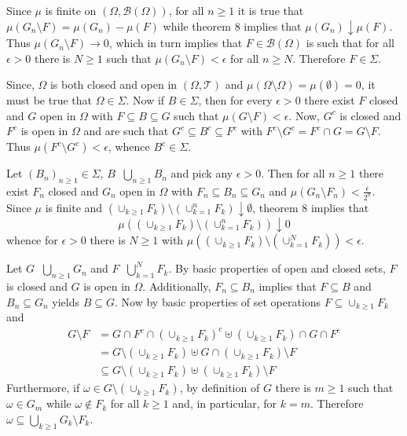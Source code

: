 \documentclass[a4paper]{article}
\newcommand{\brac}[1]{\left ( #1 \right )}
\newcommand{\Tcal}{\mathcal{T}}
\newcommand{\borel}[1]{\mathcal{B}\brac{#1}}
\newcommand{\defn}{\mathop{\overset{\Delta}{=}}\nolimits}
\begin{document}
Since $\mu$ is finite on $\brac{\Omega, \borel{\Omega}}$, for all $n\geq1$ it is true that $\mu\brac{G_n\setminus F} = \mu\brac{G_n}-\mu\brac{F}$ while theorem 8 implies that $\mu\brac{G_n}\downarrow \mu\brac{F}$. Thus $\mu\brac{G_n\setminus F}\to 0$, which in turn implies that $F\in\borel{\Omega}$ is such that for all $\epsilon>0$ there is $N\geq1$ such that $\mu\brac{G_n\setminus F}<\epsilon$ for all $n\geq N$. Therefore $F\in \Sigma$.

Since, $\Omega$ is both closed and open in $\brac{\Omega, \Tcal}$ and $\mu\brac{\Omega\setminus\Omega}=\mu\brac{\emptyset}=0$, it must be true that $\Omega\in \Sigma$. Now if $B\in \Sigma$, then for every $\epsilon>0$ there exist $F$ closed and $G$ open in $\Omega$ with $F\subseteq B\subseteq G$ such that $\mu\brac{G\setminus F}<\epsilon$. Now, $G^c$ is closed and $F^c$ is open in $\Omega$ and are such that $G^c \subseteq B^c \subseteq F^c$ with $F^c\setminus G^c = F^c\cap G = G\setminus F$. Thus $\mu\brac{F^c\setminus G^c}<\epsilon$, whence $B^c\in \Sigma$.

Let $\brac{B_n}_{n\geq1}\in \Sigma$, $B\defn \bigcup_{n\geq1} B_n$ and pick any $\epsilon>0$. Then for all $n\geq1$ there exist $F_n$ closed and $G_n$ open in $\Omega$ with $F_n\subseteq B_n\subseteq G_n$ and $\mu\brac{G_n\setminus F_n}<\frac{\epsilon}{2^n}$. Since $\mu$ is finite and $\brac{\cup_{k\geq1} F_k}\setminus\brac{\cup_{k=1}^n F_k} \downarrow \emptyset$, theorem 8 implies that \[\mu\brac{\brac{\cup_{k\geq1} F_k}\setminus\brac{\cup_{k=1}^n F_k}}\downarrow 0\] whence for $\epsilon>0$ there is $N\geq1$ with $\mu\brac{\brac{\cup_{k\geq1} F_k}\setminus\brac{\cup_{k=1}^N F_k}}<\epsilon$.

Let $G\defn \bigcup_{n\geq1} G_n$ and $F\defn \bigcup_{k=1}^N F_k$. By basic properties of open and closed sets, $F$ is closed and $G$ is open in $\Omega$. Additionally, $F_n\subseteq B_n$ implies that $F\subseteq B$ and $B_n\subseteq G_n$ yields $B\subseteq G$. Now by basic properties of set operations $F\subseteq \cup_{k\geq1} F_k$ and \begin{align*}G\setminus F &= G\cap F^c \cap \brac{\cup_{k\geq1} F_k}^c \uplus \brac{\cup_{k\geq1} F_k} \cap G\cap F^c\\&= G\setminus\brac{\cup_{k\geq1} F_k} \uplus G\cap \brac{\cup_{k\geq1} F_k}\setminus F\\&\subseteq G\setminus\brac{\cup_{k\geq1} F_k} \uplus \brac{\cup_{k\geq1} F_k}\setminus F\end{align*} Furthermore, if $\omega\in G\setminus\brac{\cup_{k\geq1} F_k}$, by definition of $G$ there is $m\geq1$ such that $\omega\in G_m$ while $\omega\notin F_k$ for all $k\geq1$ and, in particular, for $k=m$. Therefore $\omega\subseteq \bigcup_{k\geq1} G_k\setminus F_k$.
\end{document}
